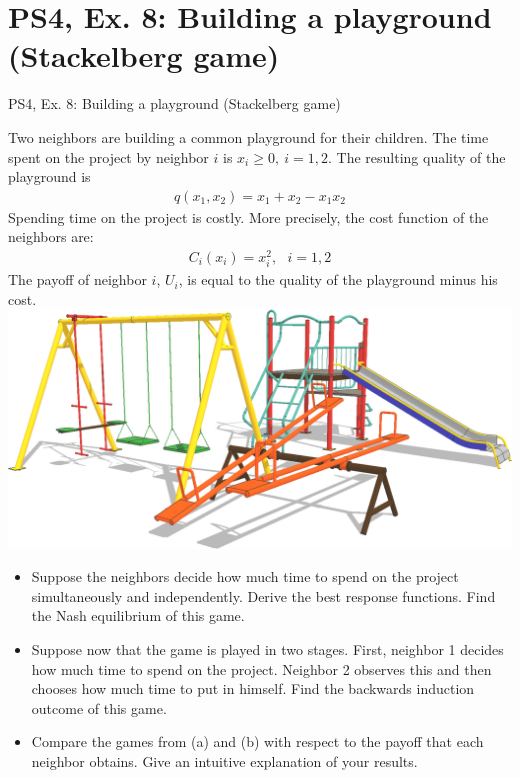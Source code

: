 \section{PS4, Ex. 8: Building a playground (Stackelberg game)}

\begin{frame}{PS4, Ex. 8: Building a playground (Stackelberg game)}
  \begin{multicols}{2}
    Two neighbors are building a common playground for their children. The time spent on the project by neighbor $i$ is $x_i \geq 0,\ i = 1, 2$. The resulting quality of the playground is
    \begin{align*}
      q(x_1,x_2)=x_1+x_2-x_1x_2
    \end{align*}
    Spending time on the project is costly. More precisely, the cost function of the neighbors are:
    \begin{align*}
      C_i(x_i)=x_i^2,\ \ \ i=1,2
    \end{align*}
    The payoff of neighbor $i$, $U_i$, is equal to the quality of the playground minus his cost.
    \includegraphics[width=\columnwidth]{figures/playground}
  \vfill\null \columnbreak
    \begin{itemize}
      \item[(a)] Suppose the neighbors decide how much time to spend on the project simultaneously and independently. Derive the best response functions. Find the Nash equilibrium of this game.
      \item[(b)] Suppose now that the game is played in two stages. First, neighbor 1 decides how much time to spend on the project. Neighbor 2 observes this and then chooses how much time to put in himself. Find the backwards induction outcome of this game.
      \item[(c)] Compare the games from (a) and (b) with respect to the payoff that each neighbor obtains. Give an intuitive explanation of your results.
    \end{itemize}
  \vfill\null
  \end{multicols}
\end{frame}
